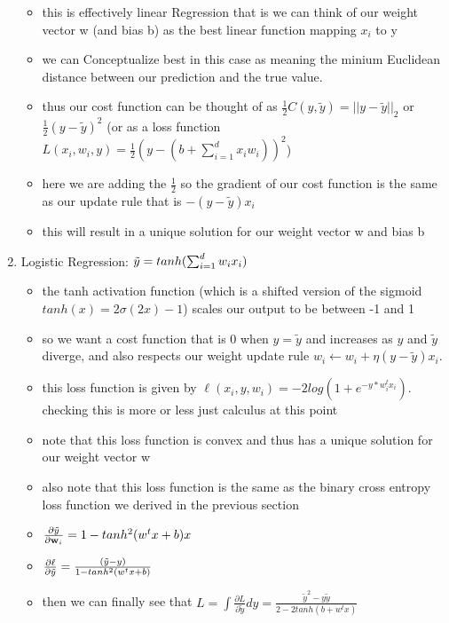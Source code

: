 \documentclass{article}
\begin{document}
\begin{enumerate}
\begin{itemize}
        \item this is effectively linear Regression that is we can think of our weight vector w (and bias b) as the best linear function mapping $x_i$ to y 
        \item we can Conceptualize best in this case as meaning the minium Euclidean distance between our prediction and the true value.
        \item thus our cost function can be thought of as $\frac{1}{2}C(y,\tilde{y})=||y-\tilde{y}||_{2}$ or $\frac{1}{2}(y-\tilde{y})^{2}$ (or as a loss function $L(x_i,w_i,y)=\frac{1}{2}(y-(b+\sum_{i=1}^{d}x_iw_i))^2 $) 
        \item here we are adding the $\frac{1}{2}$ so the gradient of our cost function is the same as our update rule that is $-(y-\tilde{y})x_i$
        \item this will result in a unique solution for our weight vector w and bias b
    \end{itemize}
    \item Logistic Regression: $\Tilde{y}=tanh(\sum_{i=1}^{d}w_ix_i)$
    \begin{itemize}
        \color{blue}
        \item the tanh activation function (which is a shifted version of the sigmoid $tanh(x)=2\sigma(2x)-1$) scales our output to be between -1 and 1
        \item so we want a  cost function that is 0 when $y=\tilde{y}$ and increases as $y$ and $\tilde{y}$ diverge, and also respects our weight update rule $w_{i}\leftarrow w_i+\eta (y-\tilde{y})x_i$. 
        \item this loss function is given by $\ell(x_i,y,w_i)=-2log(1+e^{-y*w_i^tx_i})$. checking this is more or less just calculus at this point 
        \item note that this loss function is convex and thus has a unique solution for our weight vector w
        \item also note that this loss function is the same as the binary cross entropy loss function we derived in the previous section
        \item $\frac{\partial \tilde{y}}{\partial \bold{w}_i}=1-tanh^2(w^tx+b)x$
        \item $\frac{\partial \ell}{\partial \tilde{y}}=\frac{(\Tilde{y}-y)}{1-tanh^2(w^tx+b)}$
        \item then we can finally see that $L=\int\frac{\partial L}{\partial \tilde{y}}dy=\frac{\tilde{y}^2-y\tilde{y}}{2-2tanh(b+w^tx)}$
    \end{itemize}
\end{enumerate}
\end{document}
